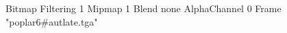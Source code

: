 {Bitmap
	{Filtering 1}
	{Mipmap 1}
	{Blend none}
	{AlphaChannel 0}
	{Frame "poplar6#autlate.tga"}
}
